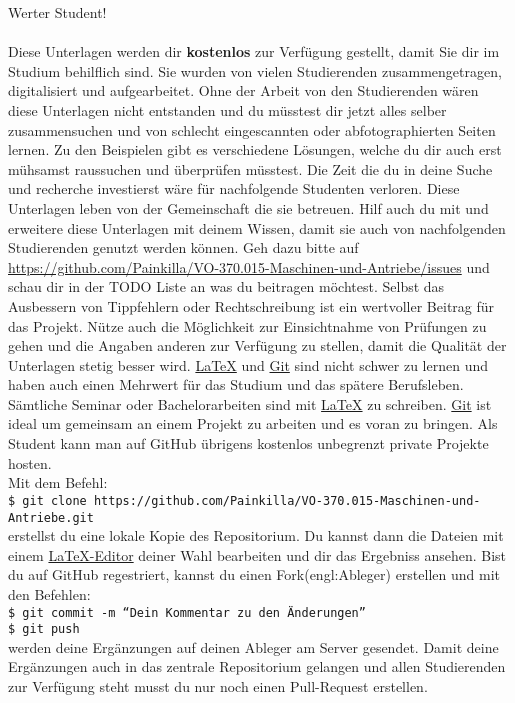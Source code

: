 \newpage %
	Werter Student!\\
	\\
	Diese Unterlagen werden dir \textbf{kostenlos} zur Verfügung gestellt, damit Sie dir im Studium behilflich sind.
	Sie wurden von vielen Studierenden zusammengetragen, digitalisiert und aufgearbeitet.
	Ohne der Arbeit von den Studierenden wären diese Unterlagen nicht entstanden und du müsstest dir jetzt alles selber zusammensuchen und von schlecht eingescannten oder abfotographierten Seiten lernen.
	Zu den Beispielen gibt es verschiedene Lösungen, welche du dir auch erst mühsamst raussuchen und überprüfen müsstest.
	Die Zeit die du in deine Suche und recherche investierst wäre für nachfolgende Studenten verloren. Diese Unterlagen leben von der Gemeinschaft die sie betreuen.
	Hilf auch du mit und erweitere diese Unterlagen mit deinem Wissen, damit sie auch von nachfolgenden Studierenden genutzt werden können.
	Geh dazu bitte auf \href{https://github.com/Painkilla/VO-370.015-Maschinen-und-Antriebe/issues}{https://github.com/Painkilla/VO-370.015-Maschinen-und-Antriebe/issues} und schau dir in der TODO Liste an was du beitragen möchtest.
	Selbst das Ausbessern von Tippfehlern oder Rechtschreibung ist ein wertvoller Beitrag für das Projekt. Nütze auch die Möglichkeit zur Einsichtnahme von Prüfungen zu gehen und die Angaben anderen zur Verfügung zu stellen, damit die Qualität der Unterlagen stetig besser wird.
	\href{https://www.latex-project.org/get/}{\LaTeX} und \href{https://git-scm.com/downloads}{Git} sind nicht schwer zu lernen und haben auch einen Mehrwert für das Studium und das spätere Berufsleben.
	Sämtliche Seminar oder Bachelorarbeiten sind mit \href{https://www.latex-project.org/get/}{\LaTeX} zu schreiben. \href{https://git-scm.com/downloads}{Git} ist ideal um gemeinsam an einem Projekt zu arbeiten und es voran zu bringen.
	Als Student kann man auf GitHub übrigens kostenlos unbegrenzt private Projekte hosten.\\
	Mit dem Befehl:\\
	\texttt{\$ git clone https://github.com/Painkilla/VO-370.015-Maschinen-und-Antriebe.git}\\
	erstellst du eine lokale Kopie des Repositorium. Du kannst dann die Dateien mit einem \href{https://www.latex-project.org/get/}{\LaTeX-Editor} deiner Wahl bearbeiten und dir das Ergebniss ansehen.
	Bist du auf GitHub regestriert, kannst du einen Fork(engl:Ableger) erstellen und mit den Befehlen:\\
	\texttt{\$ git commit -m ``Dein Kommentar zu den Änderungen''}\\
	\texttt{\$ git push}\\
	werden deine Ergänzungen auf deinen Ableger am Server gesendet. Damit deine Ergänzungen auch in das zentrale Repositorium gelangen und allen Studierenden zur Verfügung steht musst du nur noch einen Pull-Request erstellen.
	\newpage